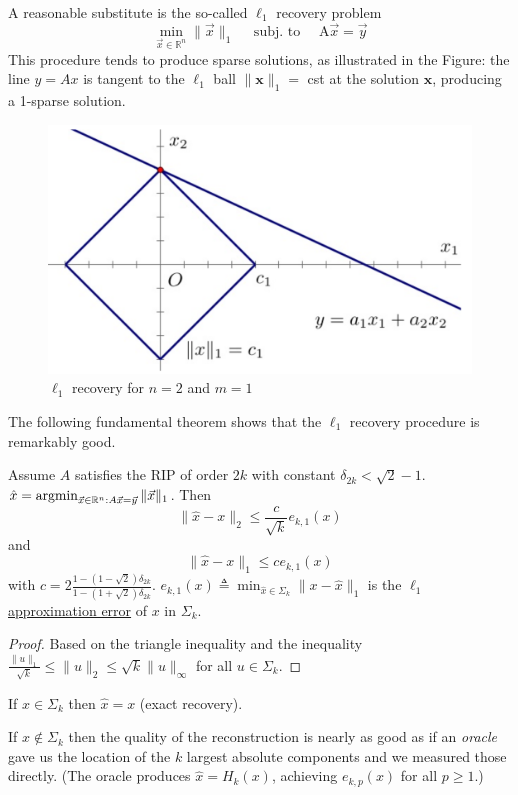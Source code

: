 \documentclass[11pt]{elegantbook}
\newcommand{\argmin}{\operatornamewithlimits{argmin}}
\begin{document}
A reasonable substitute is the so-called $\ell_1$ recovery problem
$$
\min _{\vec{x} \in \mathbb{R}^n}\|\vec{x}\|_1 \quad \text { subj. to } \quad \mathrm{A} \vec{x}=\vec{y}
$$
This procedure tends to produce sparse solutions, as illustrated in the Figure: the line $y=A x$ is tangent to the $\ell_1$ ball $\|\boldsymbol{x}\|_1=$ cst at the solution $\boldsymbol{x}$, producing a 1-sparse solution.
\begin{center}\begin{figure}[htbp]
    \centering
    \includegraphics[scale=0.25]{l1re.png}
    \caption{$\ell_1$ recovery for $n=2$ and $m=1$}
    \label{}
\end{figure}\end{center}
The following fundamental theorem shows that the $\ell_1$ recovery procedure is remarkably good.
\begin{theorem}
    Assume $A$ satisfies the RIP of order $2 k$ with constant $\delta_{2 k}<\sqrt{2}-1$. $\hat{x}=\argmin_{\vec{x}\in \mathbb{R}^n: A \vec{x}=\vec{y}}\|\vec{x}\|_1$. Then
    $$
    \|\hat{x}-x\|_2 \leq \frac{c}{\sqrt{k}} e_{k,1}(x)
    $$
    and
    $$
    \|\hat{x}-x\|_1 \leq c e_{k,1}(x)
    $$
    with $c=2 \frac{1-(1-\sqrt{2}) \delta_{2 k}}{1-(1+\sqrt{2}) \delta_{2 k}}$. $e_{k,1}(x)\triangleq \min_{\hat{x}\in \Sigma_k}\|x-\hat{x}\|_1$ is the \underline{$\ell_1$ approximation error} of $x$ in $\Sigma_k$.
\end{theorem}
\begin{proof}
    Based on the triangle inequality and the inequality $\frac{\|u\|_1}{\sqrt{k}} \leq\|u\|_2 \leq \sqrt{k}\|u\|_{\infty}$ for all $u \in \Sigma_k$.
\end{proof}

\begin{corollary}
    If $x \in \Sigma_k$ then $\hat{x}=x$ (exact recovery).
\end{corollary}
If $x \notin \Sigma_k$ then the quality of the reconstruction is nearly as good as if an \textit{oracle} gave us the location of the $k$ largest absolute components and we measured those directly. (The oracle produces $\hat{x}=H_k(x)$, achieving $e_{k, p}(x)$ for all $p \geq 1$.)
\end{document}
